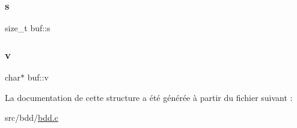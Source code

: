 \mbox{\label{structbuf_aae0f7f61347b29fa0088cbf7d952b14c}} 
\subsubsection{\texorpdfstring{s}{s}}
{\footnotesize\ttfamily size\+\_\+t buf\+::s}

\mbox{\label{structbuf_a0690d33ca270683cb07fd9a1b9f4dd68}} 
\subsubsection{\texorpdfstring{v}{v}}
{\footnotesize\ttfamily char$\ast$ buf\+::v}



La documentation de cette structure a été générée à partir du fichier suivant \+:\begin{DoxyCompactItemize}
\item 
src/bdd/\hyperlink{bdd_8c}{bdd.\+c}\end{DoxyCompactItemize}
